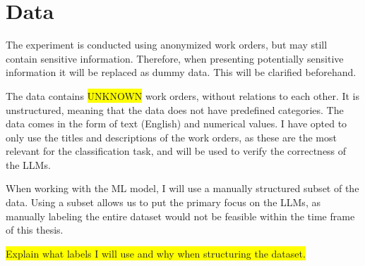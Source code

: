 \section{Data}

The experiment is conducted using anonymized work orders, but may still contain
sensitive information.
Therefore, when presenting potentially sensitive information it will be replaced
as dummy data.
This will be clarified beforehand.

The data contains \colorbox{yellow}{UNKNOWN} work orders, without relations
to each other.
It is unstructured, meaning that the data does not have predefined categories.
The data comes in the form of text (English) and numerical values.
I have opted to only use the titles and descriptions of the work orders,
as these are the most relevant for the classification task, and will be used to
verify the correctness of the LLMs.

When working with the ML model, I will use a manually structured subset of the
data.
Using a subset allows us to put the primary focus on the LLMs, as manually
labeling the entire dataset would not be feasible within the time frame of this
thesis.

\colorbox{yellow}{Explain what labels I will use and why when structuring the
    dataset.}
